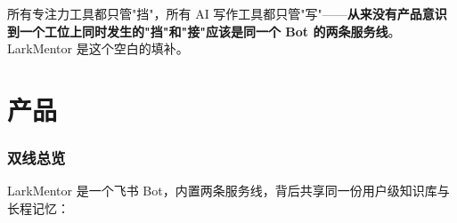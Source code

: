 \documentclass[11pt,a4paper]{ctexart}
\begin{document}
\vspace{0.6em}

\begin{infobox}
所有专注力工具都只管"挡"，所有 AI 写作工具都只管"写"——\textbf{从来没有产品意识到一个工位上同时发生的"挡"和"接"应该是同一个 Bot 的两条服务线}。LarkMentor 是这个空白的填补。
\end{infobox}

\newpage
\part{产品}

\section{双线总览}

LarkMentor 是一个飞书 Bot，内置两条服务线，背后共享同一份用户级知识库与长程记忆：
\end{document}
